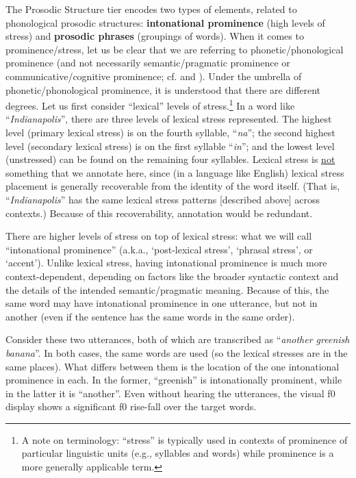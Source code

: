 \documentclass[11pt, twoside]{memoir}
\def\langtext#1{\textit{#1}}
\begin{document}
The Prosodic Structure tier encodes two types of elements, related to phonological prosodic structures: \textbf{intonational prominence} (high levels of stress) and \textbf{prosodic phrases} (groupings of words). When it comes to prominence\slash stress, let us be clear that we are referring to phonetic\slash phonological prominence (and not necessarily semantic\slash pragmatic prominence or communicative\slash cognitive prominence; cf. \citealt{gussenhoven15} and \citealt{wagner-15}). Under the umbrella of phonetic\slash phonological prominence, it is understood that there are different degrees. Let us first consider “lexical” levels of stress.\footnote{A note on terminology: “stress” is typically used in contexts of prominence of particular linguistic units (e.g., syllables and words) while prominence is a more generally applicable term.} In a word like “\langtext{Indianapolis}”, there are three levels of lexical stress represented. The highest level (primary lexical stress) is on the fourth syllable, “\langtext{na}”; the second highest level (secondary lexical stress) is on the first syllable “\langtext{in}”; and the lowest level (unstressed) can be found on the remaining four syllables. Lexical stress is \uline{not} something that we annotate here, since (in a language like English) lexical stress placement is generally recoverable from the identity of the word itself. (That is, “\langtext{Indianapolis}” has the same lexical stress patterns [described above] across contexts.) Because of this recoverability, annotation would be redundant.

There are higher levels of stress on top of lexical stress: what we will call “intonational prominence” (a.k.a., ‘post-lexical stress’, ‘phrasal stress’, or ‘accent’). Unlike lexical stress, having intonational prominence is much more context-dependent, depending on factors like the broader syntactic context and the details of the intended semantic\slash pragmatic meaning. Because of this, the same word may have intonational prominence in one utterance, but not in another (even if the sentence has the same words in the same order).

Consider these two utterances, both of which are transcribed as “\langtext{another greenish banana}”. In both cases, the same words are used (so the lexical stresses are in the same places). What differs between them is the location of the one intonational prominence in each. In the former, “greenish” is intonationally prominent, while in the latter it is “another”. Even without hearing the utterances, the visual f0 display shows a significant f0 rise-fall over the target words. 
\end{document}

